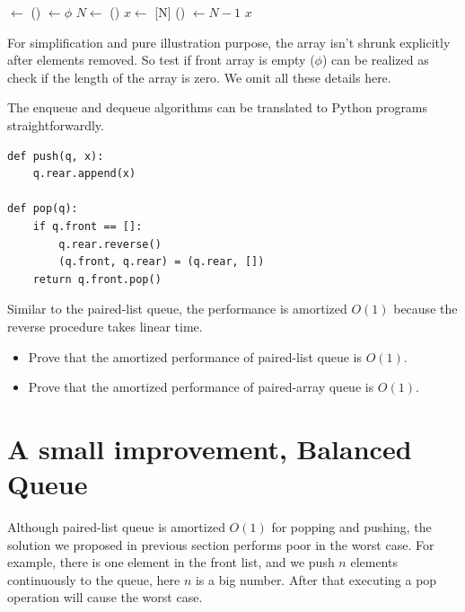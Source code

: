 \documentclass{article}
\begin{document}
\begin{algorithmic}
    \State {} $\gets$ ()
    \State {} $\gets \phi$
  \EndIf
  \State $N \gets$ ()
  \State $x \gets$ [N]
  \State {}() $\gets N - 1$
  \State \Return $x$
\EndFunction
\end{algorithmic}

For simplification and pure illustration purpose, the array isn't shrunk
explicitly after elements removed. So test if front array is empty ($\phi$)
can be realized as check if the length of the array is zero. We omit all
these details here.

The enqueue and dequeue algorithms can be translated to Python programs
straightforwardly.

\begin{lstlisting}
def push(q, x):
    q.rear.append(x)

def pop(q):
    if q.front == []:
        q.rear.reverse()
        (q.front, q.rear) = (q.rear, [])
    return q.front.pop()
\end{lstlisting}

Similar to the paired-list queue, the performance is amortized $O(1)$
because the reverse procedure takes linear time.

\begin{Exercise}
\begin{itemize}
\item Prove that the amortized performance of paired-list queue is $O(1)$.
\item Prove that the amortized performance of paired-array queue is $O(1)$.
\end{itemize}
\end{Exercise}

\section{A small improvement, Balanced Queue}

Although paired-list queue is amortized $O(1)$ for popping and pushing,
the solution we proposed in previous section performs poor in the worst case.
For example, there is one element in the front list, and we push $n$ elements
continuously to the queue, here $n$ is a big number. After that executing
a pop operation will cause the worst case.
\end{document}
